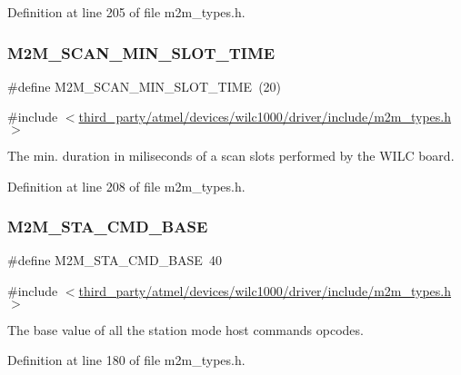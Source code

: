 Definition at line 205 of file m2m\+\_\+types.\+h.

\mbox{\label{group__WlanDefines_gad6bb7f6e8dd156db1a61f8d481f24de3}} 
\subsubsection{\texorpdfstring{M2\+M\+\_\+\+S\+C\+A\+N\+\_\+\+M\+I\+N\+\_\+\+S\+L\+O\+T\+\_\+\+T\+I\+ME}{M2M\_SCAN\_MIN\_SLOT\_TIME}}
{\footnotesize\ttfamily \#define M2\+M\+\_\+\+S\+C\+A\+N\+\_\+\+M\+I\+N\+\_\+\+S\+L\+O\+T\+\_\+\+T\+I\+ME~(20)}



{\ttfamily \#include $<$\hyperlink{m2m__types_8h}{third\+\_\+party/atmel/devices/wilc1000/driver/include/m2m\+\_\+types.\+h}$>$}

The min. duration in miliseconds of a scan slots performed by the W\+I\+LC board. 

Definition at line 208 of file m2m\+\_\+types.\+h.

\mbox{\label{group__WlanDefines_ga540bce34da625f3e2109c26409cbb127}} 
\subsubsection{\texorpdfstring{M2\+M\+\_\+\+S\+T\+A\+\_\+\+C\+M\+D\+\_\+\+B\+A\+SE}{M2M\_STA\_CMD\_BASE}}
{\footnotesize\ttfamily \#define M2\+M\+\_\+\+S\+T\+A\+\_\+\+C\+M\+D\+\_\+\+B\+A\+SE~40}



{\ttfamily \#include $<$\hyperlink{m2m__types_8h}{third\+\_\+party/atmel/devices/wilc1000/driver/include/m2m\+\_\+types.\+h}$>$}

The base value of all the station mode host commands opcodes. 

Definition at line 180 of file m2m\+\_\+types.\+h.

